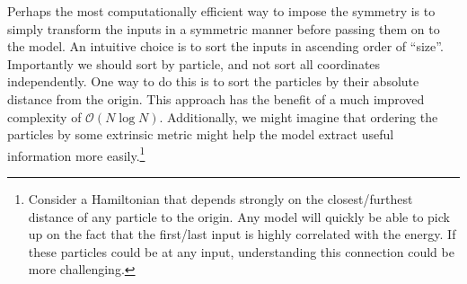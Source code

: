 \documentclass[Thesis.tex]{subfiles}
\begin{document}
Perhaps the most computationally efficient way to impose the symmetry is to
simply transform the inputs in a symmetric manner before passing them on to the
model. An intuitive choice is to sort the inputs in ascending order of ``size''.
Importantly we should sort by particle, and not sort all coordinates
independently. One way to do this is to sort the particles by their absolute
distance from the origin. This approach has the benefit of a much improved
complexity of $\mathcal{O}(N\log N)$. Additionally, we might
imagine that ordering the particles by some extrinsic metric might help the
model extract useful information more easily.\footnote{Consider a Hamiltonian
  that depends strongly on the closest/furthest distance of any particle to the
  origin. Any model will quickly be able to pick up on the fact that the
  first/last input is highly correlated with the energy. If these particles
  could be at any input, understanding this connection could be more challenging.}
\end{document}
